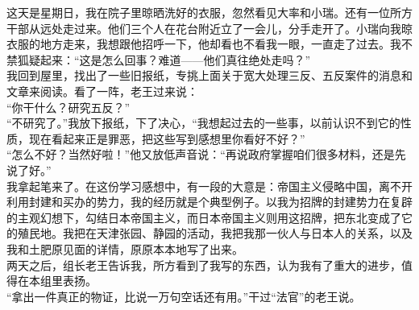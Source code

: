 这天是星期日，我在院子里晾晒洗好的衣服，忽然看见大率和小瑞。还有一位所方干部从远处走过来。他们三个人在花台附近立了一会儿，分手走开了。小瑞向我晾衣服的地方走来，我想跟他招呼一下，他却看也不看我一眼，一直走了过去。我不禁狐疑起来：“这是怎么回事？难道——他们真往绝处走吗？”\\

我回到屋里，找出了一些旧报纸，专挑上面关于宽大处理三反、五反案件的消息和文章来阅读。看了一阵，老王过来说：\\

“你干什么？研究五反？”\\

“不研究了。”我放下报纸，下了决心，“我想起过去的一些事，以前认识不到它的性质，现在看起来正是罪恶，把这些写到感想里你看好不好？”\\

“怎么不好？当然好啦！”他又放低声音说：“再说政府掌握咱们很多材料，还是先说了好。”\\

我拿起笔来了。在这份学习感想中，有一段的大意是：帝国主义侵略中国，离不开利用封建和买办的势力，我的经历就是个典型例子。以我为招牌的封建势力在复辟的主观幻想下，勾结日本帝国主义，而日本帝国主义则用这招牌，把东北变成了它的殖民地。我把在天津张园、静园的活动，我把我那一伙人与日本人的关系，以及我和土肥原见面的详情，原原本本地写了出来。\\

两天之后，组长老王告诉我，所方看到了我写的东西，认为我有了重大的进步，值得在本组里表扬。\\

“拿出一件真正的物证，比说一万句空话还有用。”干过“法官”的老王说。\\